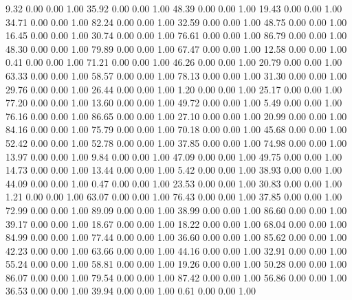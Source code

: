     9.32   0.00   0.00   1.00
   35.92   0.00   0.00   1.00
   48.39   0.00   0.00   1.00
   19.43   0.00   0.00   1.00
   34.71   0.00   0.00   1.00
   82.24   0.00   0.00   1.00
   32.59   0.00   0.00   1.00
   48.75   0.00   0.00   1.00
   16.45   0.00   0.00   1.00
   30.74   0.00   0.00   1.00
   76.61   0.00   0.00   1.00
   86.79   0.00   0.00   1.00
   48.30   0.00   0.00   1.00
   79.89   0.00   0.00   1.00
   67.47   0.00   0.00   1.00
   12.58   0.00   0.00   1.00
    0.41   0.00   0.00   1.00
   71.21   0.00   0.00   1.00
   46.26   0.00   0.00   1.00
   20.79   0.00   0.00   1.00
   63.33   0.00   0.00   1.00
   58.57   0.00   0.00   1.00
   78.13   0.00   0.00   1.00
   31.30   0.00   0.00   1.00
   29.76   0.00   0.00   1.00
   26.44   0.00   0.00   1.00
    1.20   0.00   0.00   1.00
   25.17   0.00   0.00   1.00
   77.20   0.00   0.00   1.00
   13.60   0.00   0.00   1.00
   49.72   0.00   0.00   1.00
    5.49   0.00   0.00   1.00
   76.16   0.00   0.00   1.00
   86.65   0.00   0.00   1.00
   27.10   0.00   0.00   1.00
   20.99   0.00   0.00   1.00
   84.16   0.00   0.00   1.00
   75.79   0.00   0.00   1.00
   70.18   0.00   0.00   1.00
   45.68   0.00   0.00   1.00
   52.42   0.00   0.00   1.00
   52.78   0.00   0.00   1.00
   37.85   0.00   0.00   1.00
   74.98   0.00   0.00   1.00
   13.97   0.00   0.00   1.00
    9.84   0.00   0.00   1.00
   47.09   0.00   0.00   1.00
   49.75   0.00   0.00   1.00
   14.73   0.00   0.00   1.00
   13.44   0.00   0.00   1.00
    5.42   0.00   0.00   1.00
   38.93   0.00   0.00   1.00
   44.09   0.00   0.00   1.00
    0.47   0.00   0.00   1.00
   23.53   0.00   0.00   1.00
   30.83   0.00   0.00   1.00
    1.21   0.00   0.00   1.00
   63.07   0.00   0.00   1.00
   76.43   0.00   0.00   1.00
   37.85   0.00   0.00   1.00
   72.99   0.00   0.00   1.00
   89.09   0.00   0.00   1.00
   38.99   0.00   0.00   1.00
   86.60   0.00   0.00   1.00
   39.17   0.00   0.00   1.00
   18.67   0.00   0.00   1.00
   18.22   0.00   0.00   1.00
   68.04   0.00   0.00   1.00
   84.99   0.00   0.00   1.00
   77.44   0.00   0.00   1.00
   36.60   0.00   0.00   1.00
   85.62   0.00   0.00   1.00
   42.23   0.00   0.00   1.00
   63.66   0.00   0.00   1.00
   44.16   0.00   0.00   1.00
   32.91   0.00   0.00   1.00
   55.24   0.00   0.00   1.00
   58.81   0.00   0.00   1.00
   19.26   0.00   0.00   1.00
   50.28   0.00   0.00   1.00
   86.07   0.00   0.00   1.00
   79.54   0.00   0.00   1.00
   87.42   0.00   0.00   1.00
   56.86   0.00   0.00   1.00
   36.53   0.00   0.00   1.00
   39.94   0.00   0.00   1.00
    0.61   0.00   0.00   1.00
